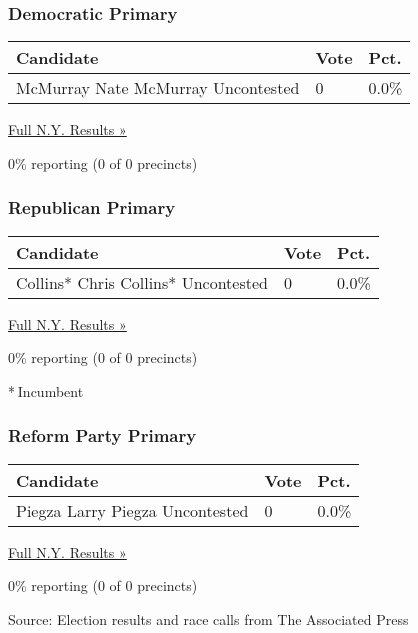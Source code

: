 \hypertarget{democratic-primary-27}{%
\subsubsection{Democratic Primary}\label{democratic-primary-27}}

\begin{longtable}[]{@{}lll@{}}
\toprule
Candidate & Vote & Pct.\tabularnewline
\midrule
\endhead
 McMurray Nate McMurray Uncontested & 0 & 0.0\%\tabularnewline
\bottomrule
\end{longtable}

\href{https://www.nytimes3xbfgragh.onion/elections/results/new-york}{Full
N.Y. Results »}

0\% reporting (0 of 0 precincts)

\hypertarget{republican-primary-21}{%
\subsubsection{Republican Primary}\label{republican-primary-21}}

\begin{longtable}[]{@{}lll@{}}
\toprule
Candidate & Vote & Pct.\tabularnewline
\midrule
\endhead
 Collins* Chris Collins* Uncontested & 0 & 0.0\%\tabularnewline
\bottomrule
\end{longtable}

\href{https://www.nytimes3xbfgragh.onion/elections/results/new-york}{Full
N.Y. Results »}

0\% reporting (0 of 0 precincts)

* Incumbent

\hypertarget{reform-party-primary-3}{%
\subsubsection{Reform Party Primary}\label{reform-party-primary-3}}

\begin{longtable}[]{@{}lll@{}}
\toprule
Candidate & Vote & Pct.\tabularnewline
\midrule
\endhead
 Piegza Larry Piegza Uncontested & 0 & 0.0\%\tabularnewline
\bottomrule
\end{longtable}

\href{https://www.nytimes3xbfgragh.onion/elections/results/new-york}{Full
N.Y. Results »}

0\% reporting (0 of 0 precincts)

Source: Election results and race calls from The Associated Press

